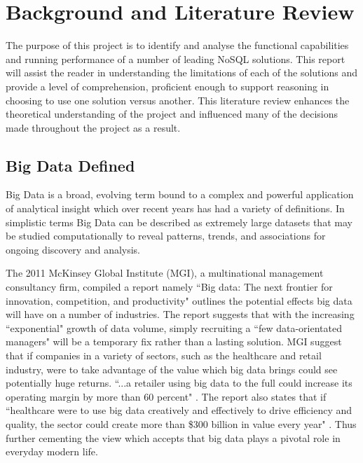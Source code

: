 \chapter{Background and Literature Review}
The purpose of this project is to identify and analyse the functional capabilities and running performance of a number of leading NoSQL solutions. This report will assist the reader in understanding the limitations of each of the solutions and provide a level of comprehension, proficient enough to support reasoning in choosing to use one solution versus another. This literature review enhances the theoretical understanding of the project and influenced many of the decisions made throughout the project as a result.
\section{Big Data Defined}\label{bigdata}
Big Data is a broad, evolving term bound to a complex and powerful application of analytical insight which over recent years has had a variety of definitions. In simplistic terms Big Data can be described as extremely large datasets that may be studied computationally to reveal patterns, trends, and associations for ongoing discovery and analysis.

The 2011 McKinsey Global Institute (MGI), a multinational management consultancy firm, compiled a report namely ``Big data: The next frontier for innovation, competition, and productivity" outlines the potential effects big data will have on a number of industries. The report suggests that with the increasing ``exponential" growth of data volume, simply recruiting a ``few data-orientated managers" will be a temporary fix rather than a lasting solution. MGI suggest that if companies in a variety of sectors, such as the healthcare and retail industry, were to take advantage of the value which big data brings could see potentially huge returns. ``...a retailer using big data to the full could increase its operating margin by more than 60 percent" \cite{mckinskey}. The report also states that if ``healthcare were to use big data creatively and effectively to drive efficiency and quality, the sector could create more than \$300 billion in value every year" \cite{mckinskey}. Thus further cementing the view which accepts that big data plays a pivotal role in everyday modern life.

